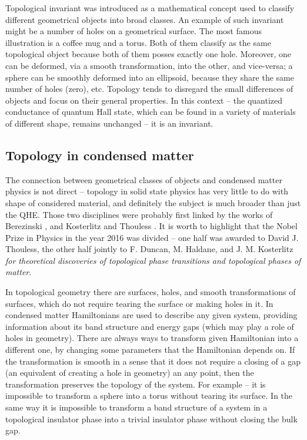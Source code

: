 \documentclass[titlepage,a4paper]{book}
\newcommand{\wciecie}{\quad\phantom{v}}
\begin{document}
Topological invariant was introduced as a mathematical concept used to classify different geometrical objects into broad classes. An example of such invariant might be a number of holes on a geometrical surface. The most famous illustration is a coffee mug and a torus. Both of them classify as the same topological object because both of them posses exactly one hole. Moreover, one can be deformed, via a smooth transformation, into the other, and vice-versa; a sphere can be smoothly deformed into an ellipsoid, because they share the same number of holes (zero), etc. Topology tends to disregard the small differences of objects and focus on their general properties. In this context -- the quantized conductance of quantum Hall state, which can be found in a variety of materials of different shape, remains unchanged -- it is an invariant. 
 
\subsection{Topology in condensed matter}
\wciecie
The connection between geometrical classes of objects and condensed matter physics is not direct -- topology in solid state physics has very little to do with shape of considered material, and definitely the subject is much broader than just the QHE. Those two disciplines were probably first linked by the works of Berezinski \cite{Berezinski1}\cite{Berezinski2}, and Kosterlitz and Thouless \cite{Thouless_nobel}. It is worth to highlight that the Nobel Prize in Physics in the year 2016 was divided -- one half was awarded to David J. Thouless, the other half jointly to F. Duncan, M. Haldane, and J. M. Kosterlitz \textit{for theoretical discoveries of topological phase transitions and topological phases of matter}.

In topological geometry there are surfaces, holes, and smooth transformations of surfaces, which do not require tearing the surface or making holes in it. In condensed matter Hamiltonians are used to describe any given system, providing information about its band structure and energy gaps (which may play a role of holes in geometry). There are always ways to transform given Hamiltonian into a different one, by changing some parameters that the Hamiltonian depends on. If the transformation is smooth in a sense that it does not require a closing of a gap (an equivalent of creating a hole in geometry) an any point, then the transformation preserves the topology of the system. For example -- it is impossible to transform a sphere into a torus without tearing its surface. In the same way it is impossible to transform a band structure of a system in a topological insulator phase into a trivial insulator phase without closing the bulk gap. 
\end{document}
